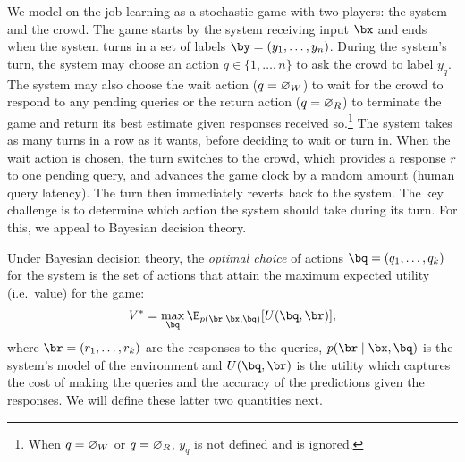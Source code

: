 

We model on-the-job learning as a stochastic game with two players: the system and the crowd.
The game starts by the system receiving input $\bx$ and ends when the system turns in a set of labels $\by = (y_1, \ldots, y_n)$. 
During the system's turn, the system may choose an action $q \in \{1, \ldots, n\}$ to ask the crowd to label $y_q$. 
The system may also choose 
the wait action ($q = \varnothing_{W}$) to wait for the crowd to respond to any pending queries
or
the return action ($q = \varnothing_{R}$) to terminate the game and return its best estimate given responses received so.\footnote{When $q = \varnothing_{W}$ or $q = \varnothing_{R}$, $y_q$ is not defined and is ignored.}
The system takes as many turns in a row as it wants, before deciding to wait or turn in.
When the wait action is chosen, the turn switches to the crowd, which provides a response $r$ to one pending query, and advances the game clock by a random amount (human query latency).
The turn then immediately reverts back to the system.
The key challenge is to determine which action the system should take during its turn.
For this, we appeal to Bayesian decision theory.

Under Bayesian decision theory, the \emph{optimal choice} of actions $\bq = (q_1, \ldots, q_k)$ for the system is the set of actions that attain the maximum expected utility (i.e.\ value) for the game:
\begin{align}
  \label{eqn:value}
V^* = \max_{\bq} \E_{p(\br \mid \bx, \bq)}[U(\bq, \br)],
\end{align}
where $\br = (r_1, \ldots, r_k)$ are the responses to the queries, $p(\br \mid \bx, \bq)$ is the system's model of the environment and $U(\bq, \br)$ is the utility which captures the cost of making the queries and the accuracy of the predictions given the responses. 
We will define these latter two quantities next.

